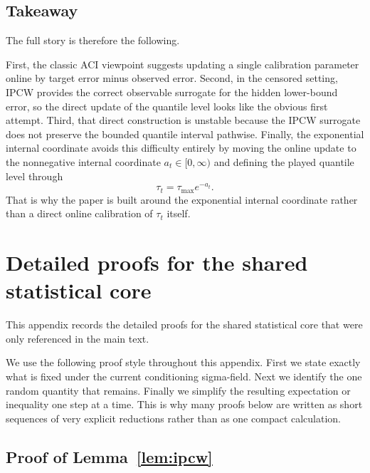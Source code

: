 \documentclass[11pt]{article}
\newcommand{\1}{\mathbf{1}}
\begin{document}
\subsection{Takeaway}

The full story is therefore the following.

First, the classic ACI viewpoint suggests updating a single calibration parameter online by target error minus observed error. Second, in the censored setting, IPCW provides the correct observable surrogate for the hidden lower-bound error, so the direct update of the quantile level looks like the obvious first attempt. Third, that direct construction is unstable because the IPCW surrogate does not preserve the bounded quantile interval pathwise. Finally, the exponential internal coordinate avoids this difficulty entirely by moving the online update to the nonnegative internal coordinate $a_t\in[0,\infty)$ and defining the played quantile level through
\[
\tau_t=\tau_{\max}e^{-a_t}.
\]
That is why the paper is built around the exponential internal coordinate rather than a direct online calibration of $\tau_t$ itself.


\section{Detailed proofs for the shared statistical core}
\label{app:core-proofs}

This appendix records the detailed proofs for the shared statistical core that were only referenced in the main text.

We use the following proof style throughout this appendix. First we state exactly what is fixed under the current conditioning sigma-field. Next we identify the one random quantity that remains. Finally we simplify the resulting expectation or inequality one step at a time. This is why many proofs below are written as short sequences of very explicit reductions rather than as one compact calculation.

\subsection{Proof of Lemma~\ref{lem:ipcw}}
\label{app:proof-ipcw}
\end{document}
